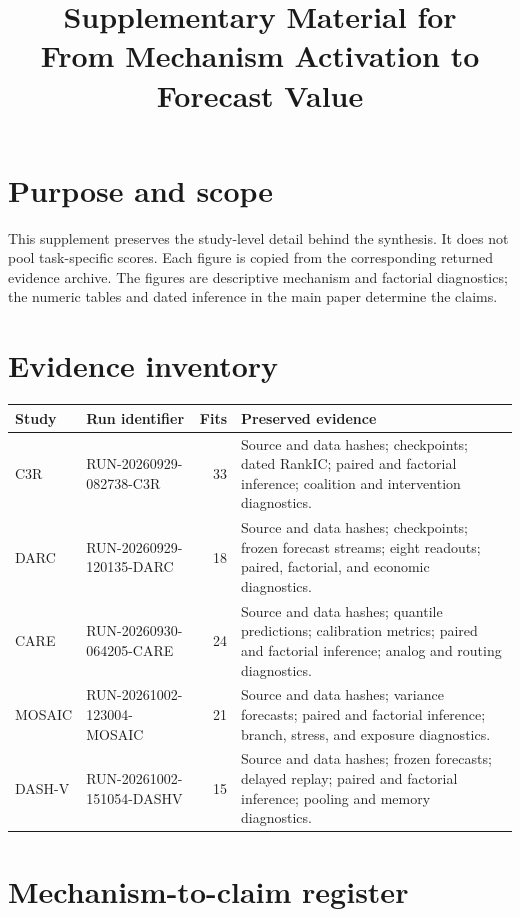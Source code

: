 \documentclass[10pt]{article}
\title{Supplementary Material for\\From Mechanism Activation to Forecast Value}
\author{}
\date{}
\begin{document}
\maketitle

\section{Purpose and scope}

This supplement preserves the study-level detail behind the synthesis. It does not pool task-specific scores. Each figure is copied from the corresponding returned evidence archive. The figures are descriptive mechanism and factorial diagnostics; the numeric tables and dated inference in the main paper determine the claims.

\section{Evidence inventory}

\begin{longtable}{p{1.6cm}p{2.3cm}rp{7.5cm}}
\toprule
Study & Run identifier & Fits & Preserved evidence \\
\midrule
C3R & RUN-20260929-082738-C3R & 33 & Source and data hashes; checkpoints; dated RankIC; paired and factorial inference; coalition and intervention diagnostics. \\
DARC & RUN-20260929-120135-DARC & 18 & Source and data hashes; checkpoints; frozen forecast streams; eight readouts; paired, factorial, and economic diagnostics. \\
CARE & RUN-20260930-064205-CARE & 24 & Source and data hashes; quantile predictions; calibration metrics; paired and factorial inference; analog and routing diagnostics. \\
MOSAIC & RUN-20261002-123004-MOSAIC & 21 & Source and data hashes; variance forecasts; paired and factorial inference; branch, stress, and exposure diagnostics. \\
DASH-V & RUN-20261002-151054-DASHV & 15 & Source and data hashes; frozen forecasts; delayed replay; paired and factorial inference; pooling and memory diagnostics. \\
\bottomrule
\end{longtable}

\section{Mechanism-to-claim register}
\end{document}
